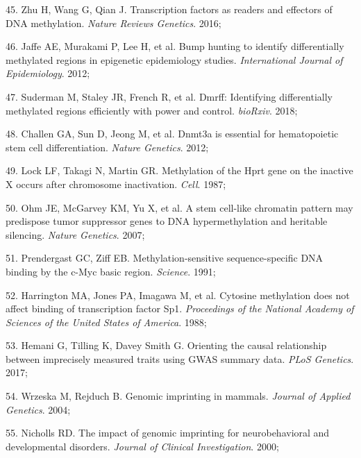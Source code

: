 \documentclass[11pt,oneside]{bristolthesis}
\newenvironment{cslreferences}%
  {}%
  {\par}
\begin{document}
\begin{cslreferences}
\leavevmode\hypertarget{ref-Zhu2016}{}%
45. Zhu H, Wang G, Qian J. Transcription factors as readers and effectors of DNA methylation. \emph{Nature Reviews Genetics}. 2016;

\leavevmode\hypertarget{ref-Jaffe2012}{}%
46. Jaffe AE, Murakami P, Lee H, et al. Bump hunting to identify differentially methylated regions in epigenetic epidemiology studies. \emph{International Journal of Epidemiology}. 2012;

\leavevmode\hypertarget{ref-Suderman2018}{}%
47. Suderman M, Staley JR, French R, et al. Dmrff: Identifying differentially methylated regions efficiently with power and control. \emph{bioRxiv}. 2018;

\leavevmode\hypertarget{ref-Challen2012}{}%
48. Challen GA, Sun D, Jeong M, et al. Dnmt3a is essential for hematopoietic stem cell differentiation. \emph{Nature Genetics}. 2012;

\leavevmode\hypertarget{ref-Lock1987}{}%
49. Lock LF, Takagi N, Martin GR. Methylation of the Hprt gene on the inactive X occurs after chromosome inactivation. \emph{Cell}. 1987;

\leavevmode\hypertarget{ref-Ohm2007}{}%
50. Ohm JE, McGarvey KM, Yu X, et al. A stem cell-like chromatin pattern may predispose tumor suppressor genes to DNA hypermethylation and heritable silencing. \emph{Nature Genetics}. 2007;

\leavevmode\hypertarget{ref-Prendergast1991}{}%
51. Prendergast GC, Ziff EB. Methylation-sensitive sequence-specific DNA binding by the c-Myc basic region. \emph{Science}. 1991;

\leavevmode\hypertarget{ref-Harrington1988}{}%
52. Harrington MA, Jones PA, Imagawa M, et al. Cytosine methylation does not affect binding of transcription factor Sp1. \emph{Proceedings of the National Academy of Sciences of the United States of America}. 1988;

\leavevmode\hypertarget{ref-Hemani2017}{}%
53. Hemani G, Tilling K, Davey Smith G. Orienting the causal relationship between imprecisely measured traits using GWAS summary data. \emph{PLoS Genetics}. 2017;

\leavevmode\hypertarget{ref-Wrzeska2004}{}%
54. Wrzeska M, Rejduch B. Genomic imprinting in mammals. \emph{Journal of Applied Genetics}. 2004;

\leavevmode\hypertarget{ref-Nicholls2000}{}%
55. Nicholls RD. The impact of genomic imprinting for neurobehavioral and developmental disorders. \emph{Journal of Clinical Investigation}. 2000;


\end{cslreferences}
\end{document}
